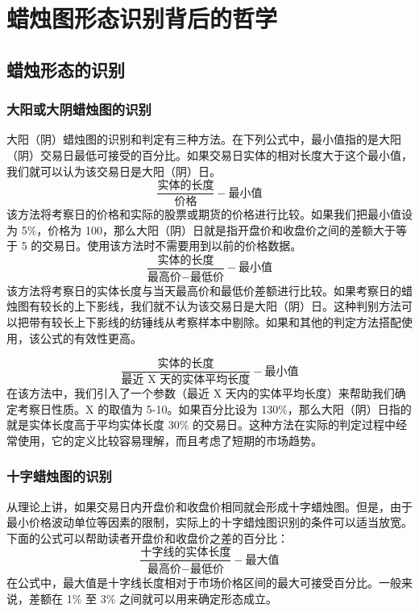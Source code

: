 \chapter{蜡烛图形态识别背后的哲学}
\section{蜡烛形态的识别}
\subsection{大阳或大阴蜡烛图的识别}
大阳（阴）蜡烛图的识别和判定有三种方法。在下列公式中，最小值指的是大阳（阴）交易日最低可接受的百分比。如果交易日实体的相对长度大于这个最小值，我们就可以认为该交易日是大阳（阴）日。
\begin{equation}
    \frac{\text{实体的长度}}{\text{价格}}-\text{最小值}
\end{equation}
该方法将考察日的价格和实际的股票或期货的价格进行比较。如果我们把最小值设为 5\%，价格为 100，那么大阳（阴）日就是指开盘价和收盘价之间的差额大于等于 5 的交易日。使用该方法时不需要用到以前的价格数据。
\begin{equation}
    \frac{\text{实体的长度}}{\text{最高价}-\text{最低价}}-\text{最小值}
\end{equation}
该方法将考察日的实体长度与当天最高价和最低价差额进行比较。如果考察日的蜡烛图有较长的上下影线，我们就不认为该交易日是大阳（阴）日。这种判别方法可以把带有较长上下影线的纺锤线从考察样本中剔除。如果和其他的判定方法搭配使用，该公式的有效性更高。

\begin{equation}
    \frac{\text{实体的长度}}{\text{最近 X 天的实体平均长度}}-\text{最小值}
\end{equation}
在该方法中，我们引入了一个参数（最近 X 天内的实体平均长度）来帮助我们确定考察日性质。X 的取值为 5-10。如果百分比设为 130\%，那么大阳（阴）日指的就是实体长度高于平均实体长度 30\% 的交易日。这种方法在实际的判定过程中经常使用，它的定义比较容易理解，而且考虑了短期的市场趋势。
\subsection{十字蜡烛图的识别}
从理论上讲，如果交易日内开盘价和收盘价相同就会形成十字蜡烛图。但是，由于最小价格波动单位等因素的限制，实际上的十字蜡烛图识别的条件可以适当放宽。下面的公式可以帮助读者开盘价和收盘价之差的百分比：
\begin{equation}
    \frac{\text{十字线的实体长度}}{\text{最高价}-\text{最低价}}-\text{最大值}
\end{equation}
在公式中，最大值是十字线长度相对于市场价格区间的最大可接受百分比。一般来说，差额在 1\% 至 3\% 之间就可以用来确定形态成立。